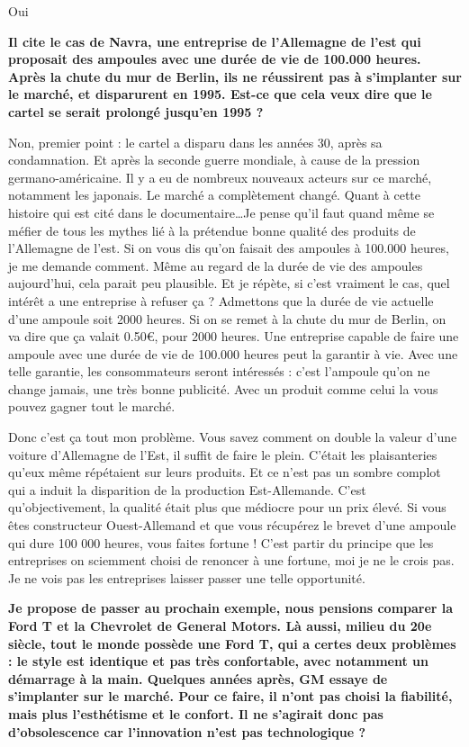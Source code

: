 \begin{small}
Oui

\textbf{Il cite le cas de \og   Navra\fg{}, une entreprise de l'Allemagne de l'est qui proposait des ampoules avec une durée de vie de 100.000 heures. Après la chute du mur de Berlin, ils ne réussirent pas à s'implanter sur le marché, et disparurent en 1995. Est-ce que cela veux dire que le cartel se serait prolongé jusqu'en 1995 ?}
\smallbreak


Non, premier point : le cartel a disparu dans les années 30, après sa condamnation. Et après la seconde guerre mondiale, à cause de la pression germano-américaine. Il y a eu de nombreux nouveaux acteurs sur ce marché, notamment les japonais. Le marché a complètement changé.
Quant à cette histoire qui est cité dans le documentaire\dots  Je pense qu'il faut quand même se méfier de tous les mythes lié à la prétendue bonne qualité des produits de l'Allemagne de l'est.
Si on vous dis qu'on faisait des ampoules à 100.000 heures, je me demande comment. Même au regard de la durée de vie des ampoules aujourd'hui, cela parait peu plausible.
Et je répète, si c'est vraiment le cas, quel intérêt a une entreprise à refuser ça ?
Admettons que la durée de vie actuelle d'une ampoule soit 2000 heures. Si on se remet à la chute du mur de Berlin, on va dire que ça valait 0.50\euro, pour 2000 heures.
Une entreprise capable de faire une ampoule avec une durée de vie de 100.000 heures peut la garantir à vie. Avec une telle garantie, les consommateurs seront intéressés : c'est l'ampoule qu'on ne change jamais, une très bonne publicité.
Avec un produit comme celui la vous pouvez gagner tout le marché.

Donc c'est ça tout mon problème. Vous savez comment on double la valeur d'une voiture d'Allemagne de l'Est, il suffit de faire le plein. C'était les plaisanteries qu'eux même répétaient sur leurs produits. Et ce n'est pas un sombre complot qui a induit la disparition de la production Est-Allemande. C'est qu'objectivement, la qualité était plus que médiocre pour un prix élevé. Si vous êtes constructeur Ouest-Allemand et que vous récupérez le brevet d'une ampoule qui dure 100 000 heures, vous faites fortune !
C'est partir du principe que les entreprises on sciemment choisi de renoncer à une fortune, moi je ne le crois pas. Je ne vois pas les entreprises laisser passer une telle opportunité.

\textbf{Je propose de passer au prochain exemple, nous pensions comparer la Ford T et la Chevrolet de General Motors. Là aussi, milieu du 20e siècle, tout le monde possède une Ford T, qui a certes deux problèmes : le style  est identique et pas très confortable, avec notamment un démarrage à la main. Quelques années après, GM essaye de s'implanter sur le marché. Pour ce faire, il n'ont pas choisi la fiabilité, mais plus l'esthétisme et le confort. Il ne s'agirait donc pas d'obsolescence car l'innovation n'est pas technologique ?}
\smallbreak



\end{small}
